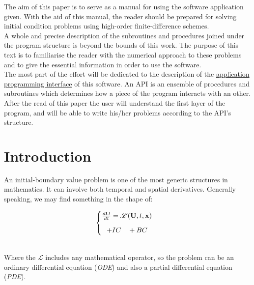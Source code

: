 
The aim of this paper is to serve as a manual for using the software application
given. With the aid of this manual, the reader should be prepared for solving
initial condition problems using high-order finite-difference schemes.\\

A whole and precise description of the subroutines and procedures joined under
the program structure is beyond the bounds of this work. The purpose of this text is
to familiarise the reader with the numerical approach to these problems and to
give the essential information in order to use the software.  \\

The most part of the effort will be dedicated to the description of the
\underline{application programming interface} of this software. An API is an
ensemble of procedures and subroutines which determines how a piece of the program interacts
with an other.  \\

After the read of this paper the user will understand the first
layer of the program, and will be able to write his/her problems
according to the API's structure. 



\newpage

\section{Introduction}

An initial-boundary value problem is one of the most generic structures in
mathematics. It can involve both temporal and spatial derivatives. Generally
speaking, we may find something in the shape of: 

\begin{Large}
$$\begin{cases} \frac{d \mathbf{U}}{dt}=   {\mathscr{L}}( \mathbf U,
	t, \mathbf x) \\[0.25cm]
	\hspace {0.25cm}+ IC \quad + BC
	\end{cases}$$
\end{Large}
\\

Where the $\mathscr{L}$ includes any mathematical operator, so the problem can
be an ordinary differential equation (\textit{ODE}) and also a partial
differential equation (\textit{PDE}). \\

